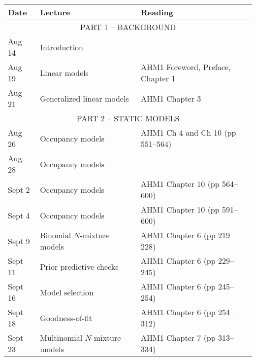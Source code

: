 \documentclass[12pt]{article}
\begin{document}
\begin{center}
\begin{tabular}[c]{lll}
\hline \hline
{\bf Date} & {\bf Lecture}                                & {\bf Reading}                                         \\
\hline
           \multicolumn{3}{c}{PART 1 -- BACKGROUND}                                                               \\
\hline
Aug 14     & Introduction                                 &                                                       \\
\hline
Aug 19     & Linear models                                & AHM1 Foreword, Preface, Chapter 1                     \\
Aug 21     & Generalized linear models                    & AHM1 Chapter 3                                        \\
\hline
           \multicolumn{3}{c}{PART 2 -- STATIC MODELS}                                                            \\
\hline
Aug 26     & Occupancy models                             & AHM1 Ch 4 and Ch 10 (pp 551--564)                     \\
Aug 28     & Occupancy models                             &                                                       \\
\hline
Sept 2     & Occupancy models                             & AHM1 Chapter 10 (pp 564--600)                         \\
Sept 4     & Occupancy models                             & AHM1 Chapter 10 (pp 591--600)                         \\
\hline
Sept 9    & Binomial $N$-mixture models                  & AHM1 Chapter 6 (pp 219--228)                          \\
Sept 11    & Prior predictive checks                      & AHM1 Chapter 6 (pp 229--245)                          \\
\hline
Sept 16    & Model selection                              & AHM1 Chapter 6 (pp 245--254)                          \\
Sept 18    & Goodness-of-fit                              & AHM1 Chapter 6 (pp 254--312)                          \\
\hline
Sept 23    & Multinomial $N$-mixture models               & AHM1 Chapter 7 (pp 313--334)                          \\

\end{tabular}
\end{center}
\end{document}
